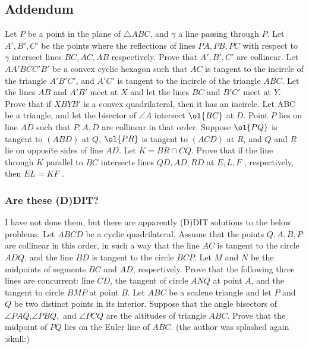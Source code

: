 \documentclass{seto}
\begin{document}
\subsection{Addendum}
\exercise[USAMO 2012/5] Let $P$ be a point in the plane of $\triangle ABC$, and $\gamma$ a line passing through $P$. Let $A', B', C'$ be the points where the reflections of lines $PA, PB, PC$ with respect to $\gamma$ intersect lines $BC, AC, AB$ respectively. Prove that $A', B', C'$ are collinear.
\exercise[Shortlist 2022/G8] Let $AA'BCC'B'$ be a convex cyclic hexagon such that $AC$ is tangent to the incircle of the triangle $A'B'C'$, and $A'C'$ is tangent to the incircle of the triangle $ABC$. Let the lines $AB$ and $A'B'$ meet at $X$ and let the lines $BC$ and $B'C'$ meet at $Y$. \\[3pt]
Prove that if $XBYB'$ is a convex quadrilateral, then it has an incircle.
\exercise[China 2020/2] Let ABC be a triangle, and let the bisector of $\angle A$ intersect $\ol{BC}$ at $D$. Point $P$ lies on line $AD$ such that $P, A, D$ are collinear in that order. Suppose $\ol{PQ}$ is tangent to $(ABD)$ at $Q$, $\ol{PR}$ is tangent to $(ACD)$ at $R$, and $Q$ and $R$ lie on opposite sides of line $AD$. Let $K = BR \cap CQ$. Prove that if the line through $K$ parallel to $BC$ intersects lines $QD, AD, RD$ at $E, L, F$ , respectively, then $EL = KF$ .

\subsubsection{Are these (D)DIT?}
I have not done them, but there are apparently (D)DIT solutions to the below problems.
\exercise[Shortlist 2022/G3] Let $ABCD$ be a cyclic quadrilateral. Assume that the points $Q, A, B, P$ are collinear in this order, in such a way that the line $AC$ is tangent to the circle $ADQ$, and the line $BD$ is tangent to the circle $BCP$. Let $M$ and $N$ be the midpoints of segments $BC$ and $AD$, respectively. Prove that the following three lines are concurrent: line $CD$, the tangent of circle $ANQ$ at point $A$, and the tangent to circle $BMP$ at point $B$.
\exercise[TSTST 2023/6] Let $ABC$ be a scalene triangle and let $P$ and $Q$ be two distinct points in its interior. Suppose that the angle bisectors of $\angle PAQ$,$\angle PBQ,$ and $\angle PCQ$ are the altitudes of triangle $ABC$. Prove that the midpoint of $\overline{PQ}$ lies on the Euler line of $ABC$. 
(the author was splashed again :skull:)
\end{document}
